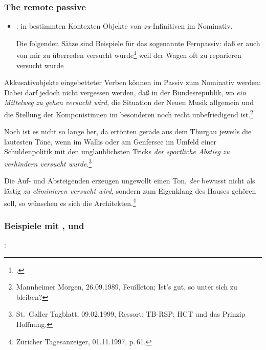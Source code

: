 \subsubsection{The remote passive}
\label{sec-remote-passive-phen}


\begin{itemize}
\item \citet[--176]{Hoehle78a}: in bestimmten Kontexten Objekte
von \emph{zu}-Infinitiven im Nominativ.

Die folgenden Sätze sind Beispiele für das sogenannte Fernpassiv:
\eal
\ex
daß er auch von mir zu überreden versucht wurde\footnote{
        .%
}
\ex
weil    der Wagen oft zu reparieren versucht wurde
\zl
\end{itemize}



Akkusativobjekte eingebetteter Verben können im Passiv zum Nominativ werden:
\eal
\ex Dabei darf jedoch nicht vergessen werden, daß in der Bundesrepublik, wo \emph{ein Mittelweg} \emph{zu gehen versucht wird}, 
die Situation der Neuen Musik allgemein und die Stellung der Komponistinnen im besonderen noch recht unbefriedigend ist.\footnote{
Mannheimer Morgen, 26.09.1989, Feuilleton; Ist's gut, so unter sich zu bleiben?
}

\ex Noch ist es nicht so lange her, da ertönten gerade aus dem Thurgau jeweils die lautesten Töne, 
    wenn im Wallis oder am Genfersee im Umfeld einer Schuldenpolitik mit den unglaublichsten Tricks 
    \emph{der sportliche Abstieg} \emph{zu verhindern versucht wurde}.\footnote{
St.\ Galler Tagblatt, 09.02.1999, Ressort: TB-RSP; HCT und das Prinzip Hoffnung.%
}

\ex Die Auf- und Absteigenden erzeugen ungewollt einen Ton,
        \emph{der} bewusst nicht als lästig \emph{zu eliminieren versucht wird}, 
    sondern zum Eigenklang des Hauses gehören soll, so wünschen es sich die Architekten.\footnote{
Züricher Tagesanzeiger, 01.11.1997, p.\,61.%
}
\zl



\subsubsection{Beispiele mit ,  und }

\citet{Wurmbrand2003a}:
\eal


